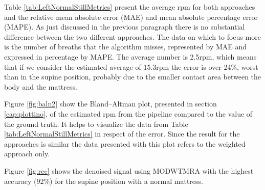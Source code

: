 \vspace{1.3cm}
%


\vspace{0.5cm}

Table \ref{tab:LeftNormalStillMetrics} present the average rpm for both approaches  
and the relative mean absolute error (MAE) and mean absolute percentage error (MAPE). As just discussed in the previous paragraph there is no substantial difference between the two different approaches. The data on which to focus more is the number of breaths that the algorithm misses, represented by MAE and expressed in percentage by MAPE. The average number is 2.5rpm, which means that if we consider the estimated average of 15.3rpm the error is over 24\%, worst than in the supine position, probably due to the smaller contact area between the body and the mattress.

\vspace{1cm}

\vspace{0.5cm}

Figure \ref{fig:baln2} show the Bland–Altman plot, presented in section \ref{cap:plottino}, of the estimated rpm from the pipeline compared to the value of the ground truth. It helps to visualize the data from Table \ref{tab:LeftNormalStillMetrics} in respect of the error. Since the result for the approaches is similar the data presented with this plot refers to the weighted approach only.

Figure \ref{fig:rec} shows the denoised signal using MODWTMRA with the highest accuracy (92\%) for the supine position with a normal mattress.

